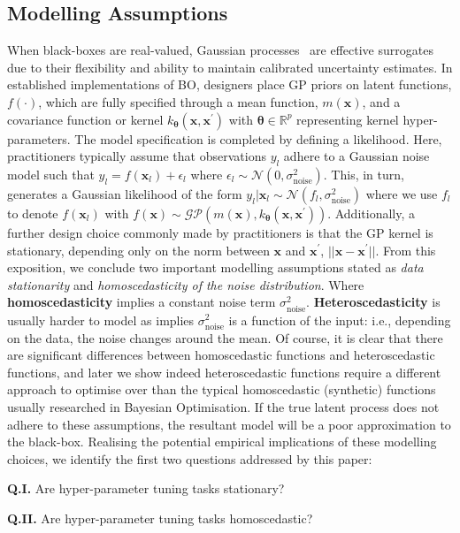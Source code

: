 \documentclass[jair,twoside,11pt,theapa]{article}
\let\cite\shortcite
\theoremstyle{definition}
\begin{document}
\subsection{Modelling Assumptions} 
When black-boxes are real-valued, Gaussian processes~\cite{2006_Williams} are effective surrogates due to their flexibility and ability to maintain calibrated uncertainty estimates. In established implementations of BO, designers place GP priors on latent functions, $f(\cdot)$, which are fully specified through a mean function, $m(\bm{x})$, and a covariance function or kernel $k_{\bm{\theta}}(\bm{x}, \bm{x}^{\prime})$ with $\bm{\theta}\in\mathbb{R}^p$ representing kernel hyper-parameters. The model specification is completed by defining a likelihood. Here, practitioners typically assume that observations $y_{l}$ adhere to a Gaussian noise model such that $y_l = f(\bm{x}_l) + \epsilon_l$ where $\epsilon_l \sim \mathcal{N}(0, \sigma_{\text{noise}}^{2})$. This, in turn, generates a Gaussian likelihood of the form $y_l | \bm{x}_{l} \sim \mathcal{N}(f_l, \sigma_{\text{noise}}^{2})$ where we use $f_l$ to denote $f(\bm{x}_{l})$ with $f(\bm{x}) \sim \mathcal{G}\mathcal{P}(m(\bm{x}), k_{\bm{\theta}}(\bm{x}, \bm{x}^{\prime}))$. Additionally, a further design choice commonly made by practitioners is that the GP kernel is stationary, depending only on the norm between $\bm{x}$ and $\bm{x}^{\prime}$, $||\bm{x} - \bm{x}^{\prime}||$. From this exposition, we conclude two important modelling assumptions stated as \emph{data stationarity} and \emph{homoscedasticity of the noise distribution}. Where \textbf{homoscedasticity} implies a constant noise term $\sigma_{\text{noise}}^{2}$. \textbf{Heteroscedasticity} is usually harder to model as implies $\sigma_{\text{noise}}^{2}$ is a function of the input: i.e., depending on the data, the noise changes around the mean. Of course, it is clear that there are significant differences between homoscedastic functions and heteroscedastic functions, and later we show indeed heteroscedastic functions require a different approach to optimise over than the typical homoscedastic (synthetic) functions usually researched in Bayesian Optimisation. If the true latent process does not adhere to these assumptions, the resultant model will be a poor approximation to the black-box. Realising the potential empirical implications of these modelling choices, we identify the first two questions addressed by this paper: \\

\par{\textbf{Q.I.}} Are hyper-parameter tuning tasks stationary? \\
\par{\textbf{Q.II.}} Are hyper-parameter tuning tasks homoscedastic? \\
\end{document}
